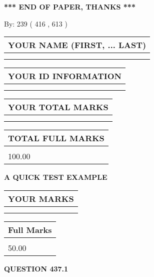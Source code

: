 \documentclass[12pt]{article}
\begin{document}
\vspace{1.0in} 
{\textbf{\large{ *** END OF PAPER, THANKS *** }}} 
   
   
\hspace{1.0in} By: 
 239 ( 416 ,  613 )
   
   
   
   
\newpage 
\setcounter{page}{ 
   437001 } 
   
   
   
   
\noindent\begin{tabular}{|l|}
\hline
YOUR NAME (FIRST, ... LAST)  \\
\hline
 \\ 
 \\ 
\hline
\end{tabular}
\hspace{0.05in} \begin{tabular}{|l|}
\hline
 YOUR   ID   INFORMATION  \\
\hline
 \\ 
 \\ 
\hline
\end{tabular}
   
   
\vspace{0.2in}\noindent\begin{tabular}{|l|}
\hline
YOUR TOTAL MARKS  \\
\hline
 \\ 
 \\ 
\hline
\end{tabular}
\hspace{0.05in} \begin{tabular}{|l|}
\hline
TOTAL FULL MARKS  \\
\hline
 \\ 
100.00 \\
\hline
\end{tabular}
   
   
 \vspace{0.2in}
{\LARGE {\textbf{ A QUICK TEST EXAMPLE}}}
   
   
  
\vspace{0.2in}
  
\noindent\begin{tabular}{|l|}
\hline
 YOUR MARKS  \\
\hline
 \\ 
 \\ 
\hline
\end{tabular}
\hspace{0.05in} \begin{tabular}{|l|}
\hline
 Full Marks  \\
\hline
 \\ 
50.00 \\
\hline
\end{tabular}
{\textbf{\Large{QUESTION
437.1 
}}}
  
\end{document}
